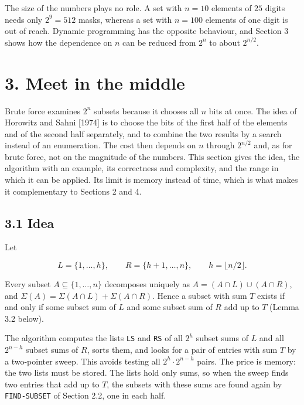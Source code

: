 \documentclass[
]{article}
\begin{document}
The size of the numbers plays no role. A set with \(n = 10\) elements of
\(25\) digits needs only \(2^{9} = 512\) masks, whereas a set with
\(n = 100\) elements of one digit is out of reach. Dynamic programming
has the opposite behaviour, and Section 3 shows how the dependence on
\(n\) can be reduced from \(2^n\) to about \(2^{n/2}\).

\hypertarget{meet-in-the-middle}{%
\section{3. Meet in the middle}\label{meet-in-the-middle}}

Brute force examines \(2^n\) subsets because it chooses all \(n\) bits
at once. The idea of Horowitz and Sahni {[}1974{]} is to choose the bits
of the first half of the elements and of the second half separately, and
to combine the two results by a search instead of an enumeration. The
cost then depends on \(n\) through \(2^{n/2}\) and, as for brute force,
not on the magnitude of the numbers. This section gives the idea, the
algorithm with an example, its correctness and complexity, and the range
in which it can be applied. Its limit is memory instead of time, which
is what makes it complementary to Sections 2 and 4.

\hypertarget{idea-1}{%
\subsection{3.1 Idea}\label{idea-1}}

Let

\[
L = \lbrace 1, \dots, h \rbrace, \qquad R = \lbrace h+1, \dots, n \rbrace, \qquad h = \lfloor n/2 \rfloor .
\]

Every subset \(A \subseteq \lbrace 1, \dots, n \rbrace\) decomposes
uniquely as \(A = (A \cap L) \cup (A \cap R)\), and
\(\Sigma(A) = \Sigma(A \cap L) + \Sigma(A \cap R)\). Hence a subset with
sum \(T\) exists if and only if some subset sum of \(L\) and some subset
sum of \(R\) add up to \(T\) (Lemma 3.2 below).

The algorithm computes the lists \texttt{LS} and \texttt{RS} of all
\(2^h\) subset sums of \(L\) and all \(2^{n-h}\) subset sums of \(R\),
sorts them, and looks for a pair of entries with sum \(T\) by a
two-pointer sweep. This avoids testing all \(2^h \cdot 2^{n-h}\) pairs.
The price is memory: the two lists must be stored. The lists hold only
sums, so when the sweep finds two entries that add up to \(T\), the
subsets with these sums are found again by \texttt{FIND-SUBSET} of
Section 2.2, one in each half.
\end{document}
